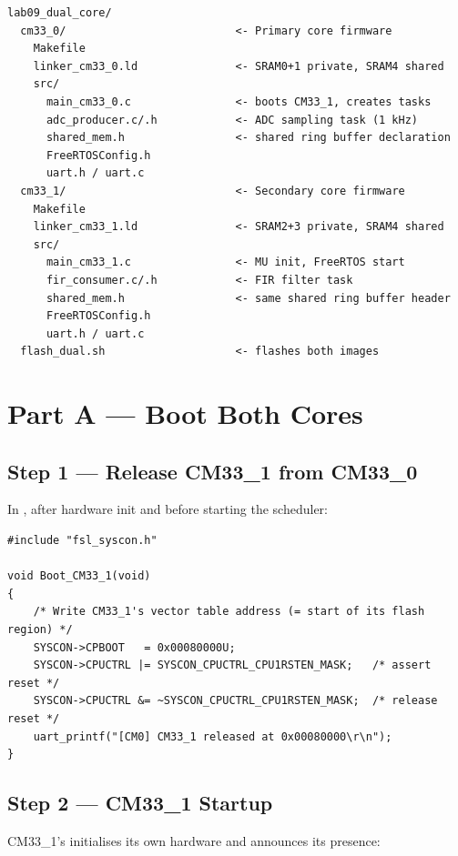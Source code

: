 \documentclass[11pt, a4paper]{article}
\begin{document}
\begin{lstlisting}[style=textstyle]
lab09_dual_core/
  cm33_0/                          <- Primary core firmware
    Makefile
    linker_cm33_0.ld               <- SRAM0+1 private, SRAM4 shared
    src/
      main_cm33_0.c                <- boots CM33_1, creates tasks
      adc_producer.c/.h            <- ADC sampling task (1 kHz)
      shared_mem.h                 <- shared ring buffer declaration
      FreeRTOSConfig.h
      uart.h / uart.c
  cm33_1/                          <- Secondary core firmware
    Makefile
    linker_cm33_1.ld               <- SRAM2+3 private, SRAM4 shared
    src/
      main_cm33_1.c                <- MU init, FreeRTOS start
      fir_consumer.c/.h            <- FIR filter task
      shared_mem.h                 <- same shared ring buffer header
      FreeRTOSConfig.h
      uart.h / uart.c
  flash_dual.sh                    <- flashes both images
\end{lstlisting}

\section{Part A --- Boot Both Cores}

\subsection{Step 1 --- Release CM33\_1 from CM33\_0}

In , after hardware init and before starting the
scheduler:

\begin{lstlisting}[style=cstyle]
#include "fsl_syscon.h"

void Boot_CM33_1(void)
{
    /* Write CM33_1's vector table address (= start of its flash region) */
    SYSCON->CPBOOT   = 0x00080000U;
    SYSCON->CPUCTRL |= SYSCON_CPUCTRL_CPU1RSTEN_MASK;   /* assert reset */
    SYSCON->CPUCTRL &= ~SYSCON_CPUCTRL_CPU1RSTEN_MASK;  /* release reset */
    uart_printf("[CM0] CM33_1 released at 0x00080000\r\n");
}
\end{lstlisting}

\subsection{Step 2 --- CM33\_1 Startup}

CM33\_1's  initialises its own hardware and announces its
presence:
\end{document}
